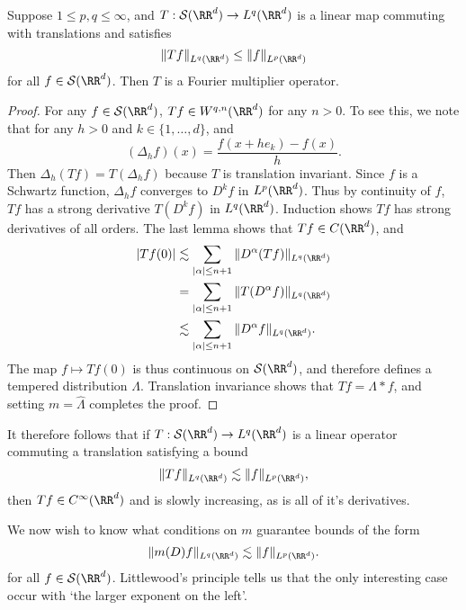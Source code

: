 \begin{theorem}
  Suppose $1 \leq p,q \leq \infty$, and $T: \mathcal{S}(\RR^d) \to L^q(\RR^d)$ is a linear map commuting with translations and satisfies
  \[ \| Tf \|_{L^q(\RR^d)} \leq \| f \|_{L^p(\RR^d)} \]
  for all $f \in \mathcal{S}(\RR^d)$. Then $T$ is a Fourier multiplier operator.
\end{theorem}
\begin{proof}
  For any $f \in \mathcal{S}(\RR^d)$, $Tf \in W^{q,n}(\RR^d)$ for any $n > 0$. To see this, we note that for any $h > 0$ and $k \in \{ 1, \dots, d \}$, and
  \[ (\Delta_h f)(x) = \frac{f(x + he_k) - f(x)}{h}. \]
  Then $\Delta_h(T f) = T(\Delta_h f)$ because $T$ is translation invariant. Since $f$ is a Schwartz function, $\Delta_h f$ converges to $D^k f$ in $L^p(\RR^d)$. Thus by continuity of $f$, $Tf$ has a strong derivative $T(D^k f)$ in $L^q(\RR^d)$. Induction shows $Tf$ has strong derivatives of all orders. The last lemma shows that $Tf \in C(\RR^d)$, and
  \begin{align*}
    |Tf(0)| &\lesssim \sum_{|\alpha| \leq n+1} \| D^\alpha(Tf) \|_{L^q(\RR^d)}\\
    &= \sum_{|\alpha| \leq n+1} \| T(D^\alpha f) \|_{L^q(\RR^d)}\\
    &\lesssim \sum_{|\alpha| \leq n+1} \| D^\alpha f \|_{L^q(\RR^d)}.
  \end{align*}
  The map $f \mapsto Tf(0)$ is thus continuous on $\mathcal{S}(\RR^d)$, and therefore defines a tempered distribution $\Lambda$. Translation invariance shows that $Tf = \Lambda * f$, and setting $m = \widehat{\Lambda}$ completes the proof.
\end{proof}

\begin{remark}
    It therefore follows that if $T: \mathcal{S}(\RR^d) \to L^q(\RR^d)$ is a linear operator commuting a translation satisfying a bound
    \[ \| Tf \|_{L^q(\RR^d)} \lesssim \| f \|_{L^p(\RR^d)}, \]
    then $Tf \in C^\infty(\RR^d)$ and is slowly increasing, as is all of it's derivatives.
\end{remark}

We now wish to know what conditions on $m$ guarantee bounds of the form
%
\[ \| m(D) f \|_{L^q(\RR^d)} \lesssim \| f \|_{L^p(\RR^d)}. \]
%
for all $f \in \mathcal{S}(\RR^d)$. Littlewood's principle tells us that the only interesting case occur with `the larger exponent on the left'.

